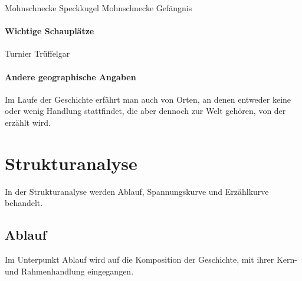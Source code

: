 {Mohnschnecke Speckkugel
Mohnschnecke Gefängnis

\subsubsection{Wichtige Schauplätze}
Turnier
Trüffelgar	

\subsubsection{Andere geographische Angaben}
Im Laufe der Geschichte erfährt man auch von Orten, an denen entweder keine oder wenig Handlung stattfindet, die aber dennoch zur Welt gehören, von der erzählt wird.


	
\chapter{Strukturanalyse}
In der Strukturanalyse werden Ablauf, Spannungskurve und Erzählkurve behandelt.

\section{Ablauf}
Im Unterpunkt Ablauf wird auf die Komposition der Geschichte, mit ihrer Kern- und Rahmenhandlung eingegangen.

}

